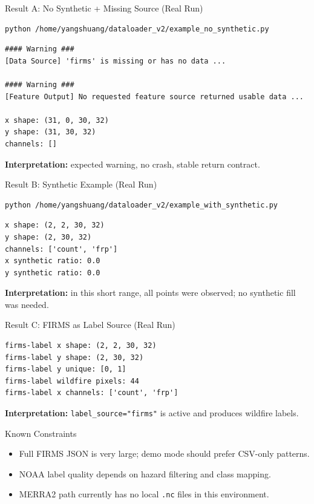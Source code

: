 \documentclass{beamer}
\begin{document}
\begin{frame}[fragile]{Result A: No Synthetic + Missing Source (Real Run)}
\begin{lstlisting}[style=pycode]
python /home/yangshuang/dataloader_v2/example_no_synthetic.py
\end{lstlisting}
\begin{lstlisting}[style=pycode]
#### Warning ###
[Data Source] 'firms' is missing or has no data ...

#### Warning ###
[Feature Output] No requested feature source returned usable data ...

x shape: (31, 0, 30, 32)
y shape: (31, 30, 32)
channels: []
\end{lstlisting}
\textbf{Interpretation:} expected warning, no crash, stable return contract.
\end{frame}

\begin{frame}[fragile]{Result B: Synthetic Example (Real Run)}
\begin{lstlisting}[style=pycode]
python /home/yangshuang/dataloader_v2/example_with_synthetic.py
\end{lstlisting}
\begin{lstlisting}[style=pycode]
x shape: (2, 2, 30, 32)
y shape: (2, 30, 32)
channels: ['count', 'frp']
x synthetic ratio: 0.0
y synthetic ratio: 0.0
\end{lstlisting}
\textbf{Interpretation:} in this short range, all points were observed; no synthetic fill was needed.
\end{frame}

\begin{frame}[fragile]{Result C: FIRMS as Label Source (Real Run)}
\begin{lstlisting}[style=pycode]
firms-label x shape: (2, 2, 30, 32)
firms-label y shape: (2, 30, 32)
firms-label y unique: [0, 1]
firms-label wildfire pixels: 44
firms-label x channels: ['count', 'frp']
\end{lstlisting}
\textbf{Interpretation:} \texttt{label\_source="firms"} is active and produces wildfire labels.
\end{frame}

\begin{frame}{Known Constraints}
\begin{itemize}
  \item Full FIRMS JSON is very large; demo mode should prefer CSV-only patterns.
  \item NOAA label quality depends on hazard filtering and class mapping.
  \item MERRA2 path currently has no local \texttt{.nc} files in this environment.
\end{itemize}
\end{frame}
\end{document}
